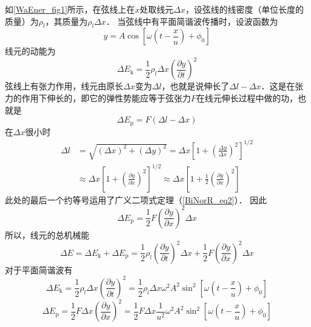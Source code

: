 如\autoref{WaEner_fig1}所示，在弦线上在$x$处取线元$\Delta x$，设弦线的线密度（单位长度的质量）为$\rho_l$，其质量为$\rho_l\Delta x$．
当弦线中有平面简谐波传播时，设波函数为
\begin{equation}
y=A \cos \left[\omega\left(t-\frac{x}{u}\right)+\phi_{0}\right]
\end{equation}
线元的动能为
\begin{equation}
\Delta E_{\mathrm{k}}=\frac{1}{2} \rho_{l} \Delta x\left(\frac{\partial y}{\partial t}\right)^{2}
\end{equation}
弦线上有张力作用，线元由原长$\Delta x$变为$\Delta l$，也就是说伸长了$\Delta l-\Delta x$．这是在张力的作用下伸长的，即它的弹性势能应等于弦张力$F$在线元伸长过程中做的功，也就是
\begin{equation}
\Delta E_{\mathrm{p}}=F(\Delta l-\Delta x)
\end{equation}
在$\Delta x$很小时
\begin{equation}
\begin{aligned} \Delta l &=\sqrt{(\Delta x)^{2}+(\Delta y)^{2}}=\Delta x\left[1+\left(\frac{\Delta y}{\Delta x}\right)^{2}\right]^{1 / 2} \\ & \approx \Delta x\left[1+\left(\frac{\partial y}{\partial x}\right)^{2}\right]^{1 / 2} \approx \Delta x\left[1+\frac{1}{2}\left(\frac{\partial y}{\partial x}\right)^{2}\right] \end{aligned}
\end{equation}
此处的最后一个约等号运用了广义二项式定理（\autoref{BiNorR_eq2}）．
因此
\begin{equation}
\Delta E_{\mathrm{p}}=\frac{1}{2} F\left(\frac{\partial y}{\partial x}\right)^{2} \Delta x
\end{equation}
所以，线元的总机械能
\begin{equation}
\Delta E=\Delta E_{\mathrm{k}}+\Delta E_{\mathrm{p}}=\frac{1}{2} \rho_{l}\left(\frac{\partial y}{\partial t}\right)^{2} \Delta x+\frac{1}{2} F\left(\frac{\partial y}{\partial x}\right)^{2} \Delta x
\end{equation}
对于平面简谐波有
\begin{equation}
\Delta E_{\mathrm{k}}=\frac{1}{2} \rho_{l} \Delta x\left(\frac{\partial y}{\partial t}\right)^{2}=\frac{1}{2} \rho_{l} \Delta x \omega^{2} A^{2} \sin ^{2}\left[\omega\left(t-\frac{x}{u}\right)+\phi_{0}\right]
\end{equation}
\begin{equation}
\Delta E_{\mathrm{p}}=\frac{1}{2} F \Delta x\left(\frac{\partial y}{\partial x}\right)^{2}=\frac{1}{2} F \Delta x \frac{1}{u^{2}} \omega^{2} A^{2} \sin ^{2}\left[\omega\left(t-\frac{x}{u}\right)+\phi_{0}\right]
\end{equation}

